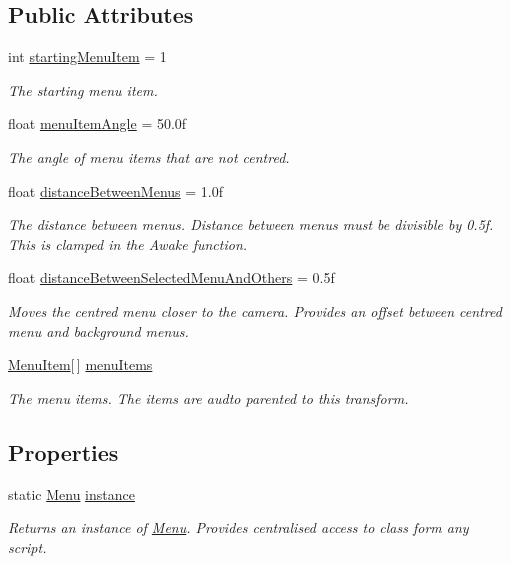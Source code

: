 \subsection*{Public Attributes}
\begin{DoxyCompactItemize}
\item 
int \hyperlink{class_swipe_menu_1_1_menu_a4ad30893c342bb33499ddea48ab0c234}{starting\+Menu\+Item} = 1
\begin{DoxyCompactList}\small\item\em The starting menu item. \end{DoxyCompactList}\item 
float \hyperlink{class_swipe_menu_1_1_menu_a8ad641c029ba5597d87ced951e5d8e4b}{menu\+Item\+Angle} = 50.\+0f
\begin{DoxyCompactList}\small\item\em The angle of menu items that are not centred. \end{DoxyCompactList}\item 
float \hyperlink{class_swipe_menu_1_1_menu_a09b844a5c50d0a52b0f281a57dd9013e}{distance\+Between\+Menus} = 1.\+0f
\begin{DoxyCompactList}\small\item\em The distance between menus. Distance between menus must be divisible by 0.\+5f. This is clamped in the Awake function. \end{DoxyCompactList}\item 
float \hyperlink{class_swipe_menu_1_1_menu_a2b2fcb8ac09988c22e2e38a43495fd93}{distance\+Between\+Selected\+Menu\+And\+Others} = 0.\+5f
\begin{DoxyCompactList}\small\item\em Moves the centred menu closer to the camera. Provides an offset between centred menu and background menus. \end{DoxyCompactList}\item 
\hyperlink{class_swipe_menu_1_1_menu_item}{Menu\+Item}\mbox{[}$\,$\mbox{]} \hyperlink{class_swipe_menu_1_1_menu_ac05bfc6ab9e0d2655d17fda6bdc7bbf7}{menu\+Items}
\begin{DoxyCompactList}\small\item\em The menu items. The items are audto parented to this transform. \end{DoxyCompactList}\end{DoxyCompactItemize}
\subsection*{Properties}
\begin{DoxyCompactItemize}
\item 
static \hyperlink{class_swipe_menu_1_1_menu}{Menu} \hyperlink{class_swipe_menu_1_1_menu_a40ef17eefa3f42dd71cdc213b42c3246}{instance}
\begin{DoxyCompactList}\small\item\em Returns an instance of \hyperlink{class_swipe_menu_1_1_menu}{Menu}. Provides centralised access to class form any script. \end{DoxyCompactList}\end{DoxyCompactItemize}


